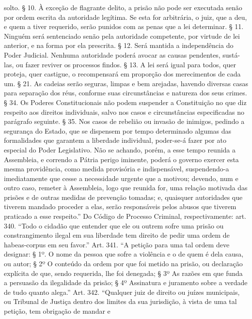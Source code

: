 {  solto. § 10. À exceção de flagrante delito, a prisão não pode ser
  executada senão por ordem escrita da autoridade legítima. Se esta for
  arbitrária, o juiz, que a deu, e quem a tiver requerido, serão punidos
  com as penas que a lei determinar. § 11. Ninguém será sentenciado
  senão pela autoridade competente, por virtude de lei anterior, e na
  forma por ela prescrita. § 12. Será mantida a independência do Poder
  Judicial. Nenhuma autoridade poderá avocar as causas pendentes,
  sustá-las, ou fazer reviver os processos findos. § 13. A lei será
  igual para todos, quer proteja, quer castigue, o recompensará em
  proporção dos merecimentos de cada um. § 21. As cadeias serão seguras,
  limpas e bem arejadas, havendo diversas casas para separação dos réus,
  conforme suas circunstâncias e natureza dos seus crimes. § 34. Os
  Poderes Constitucionais não podem suspender a Constituição no que diz
  respeito aos direitos individuais, salvo nos casos e circunstâncias
  especificadas no parágrafo seguinte. § 35. Nos casos de rebelião ou
  invasão de inimigos, pedindo a segurança do Estado, que se dispensem
  por tempo determinado algumas das formalidades que garantem a
  liberdade individual, poder-se-á fazer por ato especial do Poder
  Legislativo. Não se achando, porém, a esse tempo reunida a Assembleia,
  e correndo a Pátria perigo iminente, poderá o governo exercer esta
  mesma providência, como medida provisória e indispensável,
  suspendendo-a imediatamente que cesse a necessidade urgente que a
  motivou; devendo, num e outro caso, remeter à Assembleia, logo que
  reunida for, uma relação motivada das prisões e de outras medidas de
  prevenção tomadas; e, quaisquer autoridades que tiverem mandado
  proceder a elas, serão responsáveis pelos abusos que tiverem praticado
  a esse respeito.'' Do Código de Processo Criminal, respectivamente:
  art. 340. ``Todo o cidadão que entender que ele ou outrem sofre uma
  prisão ou constrangimento ilegal em sua liberdade tem direito de
  pedir uma ordem de habeas-corpus em seu favor.'' Art. 341. ``A petição
  para uma tal ordem deve designar: § 1º. O nome da pessoa que sofre a
  violência e o de quem é dela causa, ou autor; § 2º O conteúdo da ordem
  por que foi metido na prisão, ou declaração explícita de que, sendo
  requerida, lhe foi denegada; § 3º As razões em que funda a persuasão
  da ilegalidade da prisão; § 4º Assinatura e juramento sobre a verdade
  de tudo quanto alega.'' Art. 342. ``Qualquer juiz de direito ou juízes
  municipais, ou Tribunal de Justiça dentro dos limites da sua
  jurisdição, à vista de uma tal petição, tem obrigação de mandar e
}
